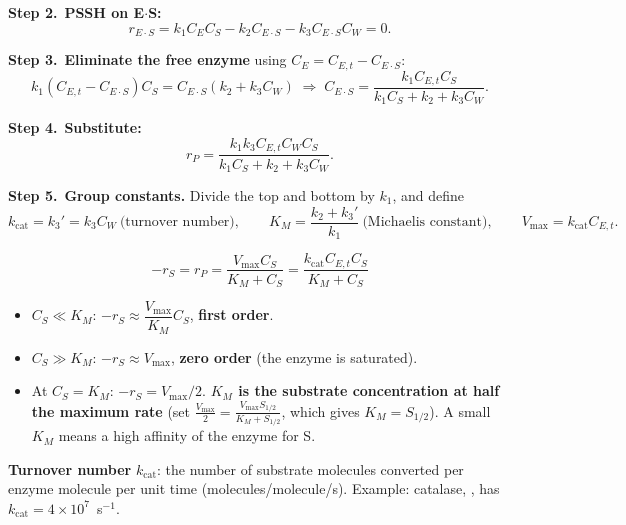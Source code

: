 \documentclass[11pt]{article}
\newcommand{\step}[1]{\par\smallskip\textcolor{stepgray}{\textbf{Step #1.}}\ }
\begin{document}
\step{2}\textbf{PSSH on E$\cdot$S:}
\[
r_{E\cdot S}=k_1C_EC_S-k_2C_{E\cdot S}-k_3C_{E\cdot S}C_W=0 .
\]
\step{3}\textbf{Eliminate the free enzyme} using $C_E=C_{E,t}-C_{E\cdot S}$:
\[
k_1(C_{E,t}-C_{E\cdot S})C_S=C_{E\cdot S}(k_2+k_3C_W)
\;\Rightarrow\;
C_{E\cdot S}=\frac{k_1C_{E,t}C_S}{k_1C_S+k_2+k_3C_W}.
\]
\step{4}\textbf{Substitute:}
\[
r_P=\frac{k_1k_3C_{E,t}C_WC_S}{k_1C_S+k_2+k_3C_W}.
\]
\step{5}\textbf{Group constants.} Divide the top and bottom by $k_1$, and define
\[
k_{\text{cat}}=k_3'=k_3C_W\ \text{(turnover number)},\qquad
K_M=\frac{k_2+k_3'}{k_1}\ \text{(Michaelis constant)},\qquad
V_{\max}=k_{\text{cat}}C_{E,t}.
\]
\begin{keyresult}
\[
-r_S=r_P=\frac{V_{\max}C_S}{K_M+C_S}=\frac{k_{\text{cat}}C_{E,t}C_S}{K_M+C_S}
\]
\begin{itemize}
\item $C_S\ll K_M$: $-r_S\approx\dfrac{V_{\max}}{K_M}C_S$, \textbf{first order}.
\item $C_S\gg K_M$: $-r_S\approx V_{\max}$, \textbf{zero order} (the enzyme is saturated).
\item At $C_S=K_M$: $-r_S=V_{\max}/2$. \textbf{$K_M$ is the substrate concentration at half the maximum rate}
(set $\frac{V_{\max}}{2}=\frac{V_{\max}S_{1/2}}{K_M+S_{1/2}}$, which gives $K_M=S_{1/2}$).
A small $K_M$ means a high affinity of the enzyme for S.
\end{itemize}
\end{keyresult}

\textbf{Turnover number} $k_{\text{cat}}$: the number of substrate molecules converted per enzyme molecule per unit time
(molecules/molecule/s). Example: catalase, , has $k_{\text{cat}}=4\times10^{7}$~s$^{-1}$.
\end{document}

